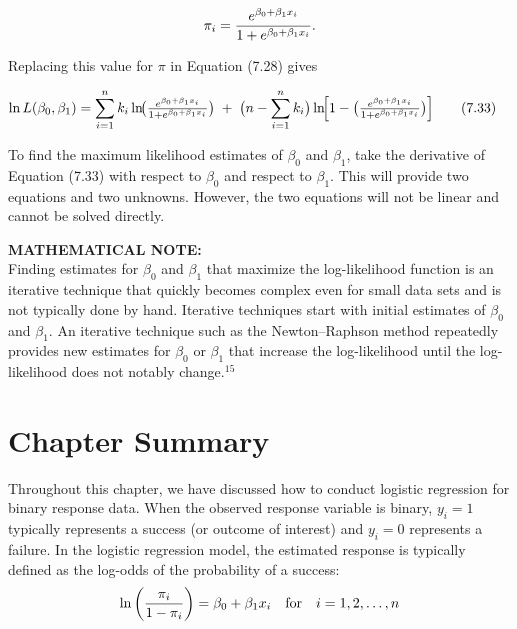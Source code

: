\documentclass[
]{report}
\begin{document}
\[
\pi_i = \frac{e^{\beta_0 + \beta_1 x_i}}{1 + e^{\beta_0 + \beta_1 x_i}}.
\notag
\]

Replacing this value for \(\pi\) in Equation (7.28) gives

\begin{align}
\ln L(\beta_0, \beta_1)
&= \sum_{i=1}^n k_i \ln\!\bigl(\tfrac{e^{\beta_0 + \beta_1 x_i}}{1 + e^{\beta_0 + \beta_1 x_i}}\bigr)
\;+\;\bigl(n - \sum_{i=1}^n k_i\bigr)\ln\!\Bigl[1 - \bigl(\tfrac{e^{\beta_0 + \beta_1 x_i}}{1 + e^{\beta_0 + \beta_1 x_i}}\bigr)\Bigr]
\tag{7.33}
\end{align}

To find the maximum likelihood estimates of \(\beta_0\) and \(\beta_1\), take the derivative of Equation (7.33) with respect to \(\beta_0\) and respect to \(\beta_1\). This will provide two equations and two unknowns. However, the two equations will not be linear and cannot be solved directly.

\large

\textbf{MATHEMATICAL NOTE:}\\
Finding estimates for \(\beta_0\) and \(\beta_1\) that maximize the log-likelihood function is an iterative technique that quickly becomes complex even for small data sets and is not typically done by hand. Iterative techniques start with initial estimates of \(\beta_0\) and \(\beta_1\). An iterative technique such as the Newton--Raphson method repeatedly provides new estimates for \(\beta_0\) or \(\beta_1\) that increase the log-likelihood until the log-likelihood does not notably change.\(^{15}\)\\
\normalsize

\hypertarget{chapter-summary-6}{%
\section*{\texorpdfstring{\textbf{Chapter Summary}}{Chapter Summary}}\label{chapter-summary-6}}

Throughout this chapter, we have discussed how to conduct logistic regression for binary response data. When the observed response variable is binary, \(y_i = 1\) typically represents a success (or outcome of interest) and \(y_i = 0\) represents a failure. In the logistic regression model, the estimated response is typically defined as the log-odds of the probability of a success:
\begin{align}
\ln\left(\frac{\pi_i}{1-\pi_i}\right) = \beta_0 + \beta_1 x_i \quad \text{for} \quad i = 1, 2, \ldots, n
\notag
\end{align}
\end{document}
